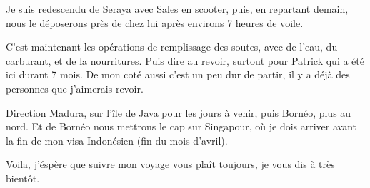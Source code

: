 \begin{multicols}{2}
Je suis redescendu de Seraya avec Sales en scooter, puis, en repartant demain, nous le déposerons près de chez lui après environs 7 heures de voile.

C'est maintenant les opérations de remplissage des soutes, avec de l'eau, du carburant, et de la nourritures. Puis dire au revoir, surtout pour Patrick qui a été ici durant 7 mois. De mon coté aussi c'est un peu dur de partir, il y a déjà des personnes que j'aimerais revoir.

Direction Madura, sur l'île de Java pour les jours à venir, puis Bornéo, plus au nord. Et de Bornéo nous mettrons le cap sur Singapour, où je dois arriver avant la fin de mon visa Indonésien (fin du mois d'avril).

Voila, j'éspère que suivre mon voyage vous plaît toujours, je vous dis à très bientôt.

\end{multicols}


